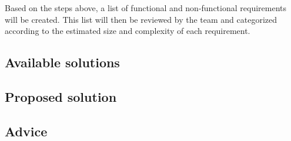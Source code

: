 Based on the steps above, a list of functional and non-functional requirements will be created. This list will then be reviewed by the team and categorized according to the estimated size and complexity of each requirement.

 

\subsection{Available solutions}
\label{subsec:Available solutions}

\subsection{Proposed solution}
\label{subsec:Proposed solution}

\subsection{Advice}
\label{subsec:Advice}

